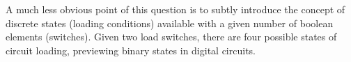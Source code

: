 A much less obvious point of this question is to subtly introduce the concept of discrete states (loading conditions) available with a given number of boolean elements (switches).  Given two load switches, there are four possible states of circuit loading, previewing binary states in digital circuits.




